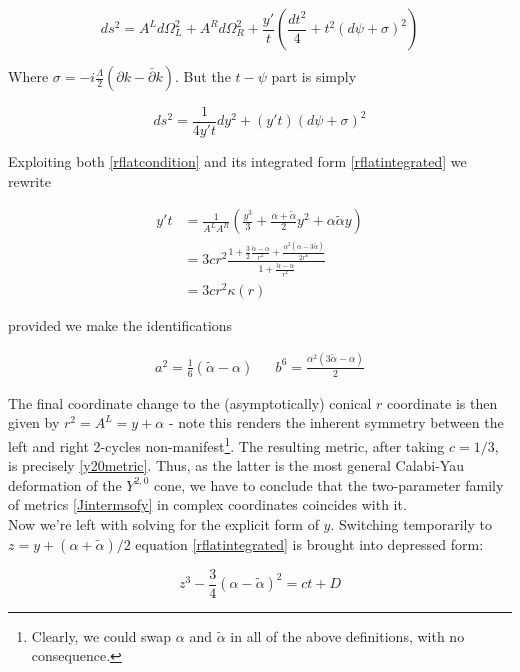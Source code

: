 \begin{equation}
	ds^2 = A^L d\Omega^2_L + A^R d\Omega^2_R + \frac{y'}{t} \left( \frac{dt^2}{4} + t^2 (d\psi + \sigma)^2 \right)
\end{equation}

Where $\sigma = -i\frac{\Lambda}{2}(\partial k - \bar \partial k)$. But the $t-\psi$ part is simply

\begin{equation}
	ds^2 = \frac{1}{4y't} dy^2 + (y' t) (d\psi + \sigma)^2
\end{equation}

Exploiting both \ref{rflatcondition} and its integrated form \ref{rflatintegrated} we rewrite

\begin{align}
	y't & = \frac{1}{A^L A^R} \left( \frac{y^3}{3} + \frac{\alpha + \tilde{\alpha}}{2} y^2 + \alpha \tilde{\alpha} y \right)\\
	& = 3cr^2 \frac{1+ \frac{3}{2} \frac{\tilde{\alpha} - \alpha}{r^2} + \frac{\alpha^{2}(\alpha - 3 \tilde{\alpha})}{2r^6} }{1+ \frac{\tilde{\alpha} -\alpha}{r^2} }\\
	& = 3cr^2 \kappa(r)
\end{align}

provided we make the identifications

\begin{align}
	a^2 = \frac{1}{6}(\tilde{\alpha} - \alpha) && b^6 = \frac{\alpha^{2}(3\tilde{\alpha}-\alpha)}2
	\label{}
\end{align}

The final coordinate change to the (asymptotically) conical $r$ coordinate is then given by $r^2 = A^L = y + \alpha$ - note this renders the inherent symmetry between the left and right 2-cycles non-manifest\footnote{Clearly, we could swap $\alpha$ and $\tilde{\alpha}$ in all of the above definitions, with no consequence.}. The resulting metric, after taking $c=1/3$, is precisely \ref{y20metric}. Thus, as the latter is the most general Calabi-Yau deformation of the $Y^{2,0}$ cone, we have to conclude that the two-parameter family of metrics \ref{Jintermsofy} in complex coordinates coincides with it.\\

Now we're left with solving for the explicit form of $y$. Switching temporarily to $z = y + (\alpha + \tilde\alpha)/2$ equation \ref{rflatintegrated} is brought into depressed form:

\begin{equation}
	z^3 - \frac{3}4 (\alpha - \tilde\alpha)^2 = ct + D
	\label{depressed}
\end{equation}

